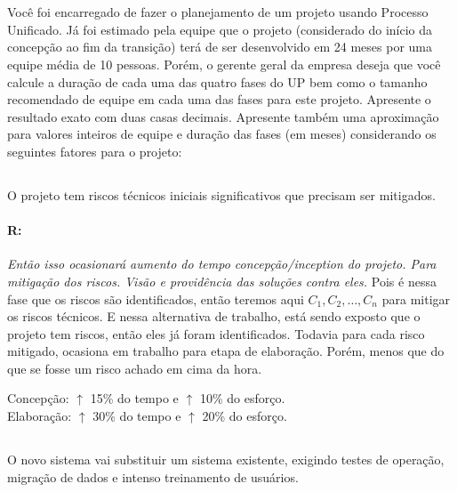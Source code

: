 \documentclass[10pt, a4paper]{report}
\begin{document}
\section{}
\qquad Você foi encarregado de fazer o planejamento de um projeto usando
Processo Unificado. Já foi estimado pela equipe que o projeto (considerado do
início da concepção ao fim da transição) terá de ser desenvolvido em 24 meses
por uma equipe média de 10 pessoas. Porém, o gerente geral da empresa deseja que
você calcule a duração de cada uma das quatro fases do UP bem como o tamanho
recomendado de equipe em cada uma das fases para este projeto. Apresente o
resultado exato com duas casas decimais. Apresente também uma aproximação para
valores inteiros de equipe e duração das fases (em meses) considerando os
seguintes fatores para o projeto:

\subsection{}
\qquad O projeto tem riscos técnicos iniciais significativos que precisam ser
mitigados.

\paragraph{R:}

\textit{Então isso ocasionará aumento do tempo concepção/inception do projeto.
Para mitigação dos riscos. Visão e providência das soluções contra eles.} Pois é
nessa fase que os riscos são identificados, então teremos aqui $C_1, C_2, \dots,
C_n$ para mitigar os riscos técnicos. E nessa alternativa de trabalho, está
sendo exposto que o projeto tem riscos, então eles já foram identificados.
Todavia para cada risco mitigado, ocasiona em trabalho para etapa de elaboração.
Porém, menos que do que se fosse um risco achado em cima da hora.

\begin{center}
  \begin{Large}
    Concepção: $\uparrow$ 15\% do tempo e $\uparrow$ 10\% do esforço.\\
    Elaboração: $\uparrow$ 30\% do tempo e $\uparrow$ 20\% do esforço.
  \end{Large}
\end{center}

\subsection{}
\qquad O novo sistema vai substituir um sistema existente, exigindo testes de
operação, migração de dados e intenso treinamento de usuários.
\end{document}

